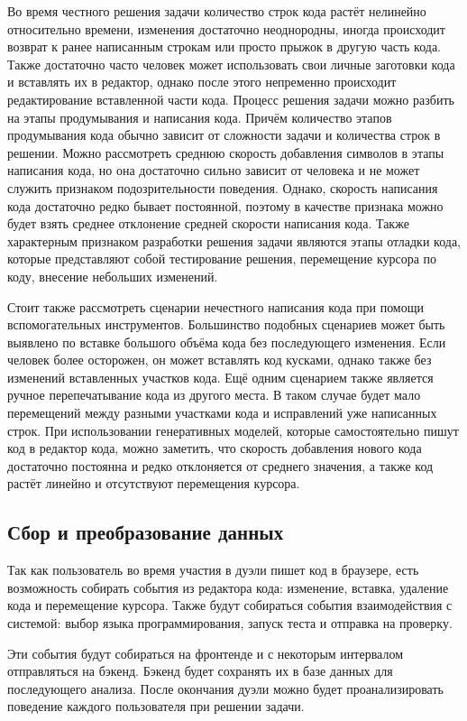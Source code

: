 Во время честного решения задачи количество строк кода растёт нелинейно относительно времени,
изменения достаточно неоднородны, иногда происходит возврат к ранее написанным строкам или просто прыжок в другую часть кода.
Также достаточно часто человек может использовать свои личные заготовки кода и вставлять их в редактор,
однако после этого непременно происходит редактирование вставленной части кода.
Процесс решения задачи можно разбить на этапы продумывания и написания кода.
Причём количество этапов продумывания кода обычно зависит от сложности задачи и количества строк в решении.
Можно рассмотреть среднюю скорость добавления символов в этапы написания кода,
но она достаточно сильно зависит от человека и не может служить признаком подозрительности поведения.
Однако, скорость написания кода достаточно редко бывает постоянной,
поэтому в качестве признака можно будет взять среднее отклонение средней скорости написания кода.
Также характерным признаком разработки решения задачи являются этапы отладки кода,
которые представляют собой тестирование решения, перемещение курсора по коду, внесение небольших изменений.

Стоит также рассмотреть сценарии нечестного написания кода при помощи вспомогательных инструментов.
Большинство подобных сценариев может быть выявлено по вставке большого объёма кода без последующего изменения.
Если человек более осторожен, он может вставлять код кусками, однако также без изменений вставленных участков кода.
Ещё одним сценарием также является ручное перепечатывание кода из другого места.
В таком случае будет мало перемещений между разными участками кода и исправлений уже написанных строк.
При использовании генеративных моделей, которые самостоятельно пишут код в редактор кода, можно заметить,
что скорость добавления нового кода достаточно постоянна и редко отклоняется от среднего значения,
а также код растёт линейно и отсутствуют перемещения курсора.

\subsection{Сбор и преобразование данных}

Так как пользователь во время участия в дуэли пишет код в браузере,
есть возможность собирать события из редактора кода: изменение, вставка, удаление кода и перемещение курсора.
Также будут собираться события взаимодействия с системой: выбор языка программирования, запуск теста и отправка на проверку.

Эти события будут собираться на фронтенде и с некоторым интервалом отправляться на бэкенд.
Бэкенд будет сохранять их в базе данных для последующего анализа.
После окончания дуэли можно будет проанализировать поведение каждого пользователя при решении задачи.

